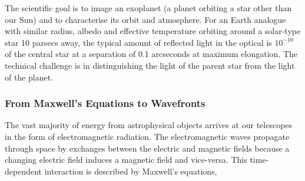 \documentclass[letterpaper]{ar-1col}
\begin{document}



The scientific goal is to image an exoplanet (a planet orbiting a star other than our Sun) and to characterise its orbit and atmosphere.
%
For an Earth analogue with similar radius, albedo and effective temperature orbiting around a solar-type star 10 parsecs away, the typical amount of reflected light in the optical is $10^{-10}$ of the central star at a separation of 0.1 arcseconds at maximum elongation.
%
The technical challenge is in distinguishing the light of the parent star from the light of the planet.

\subsubsection{From Maxwell's Equations to Wavefronts}
The vast majority of energy from astrophysical objects arrives at our telescopes in the form of electromagnetic radiation.
%
The electromagnetic waves propagate through space by exchanges between the electric and magnetic fields because a changing electric field induces a magnetic field and vice-versa.
%
This time-dependent interaction is described by Maxwell's equations,
\end{document}

